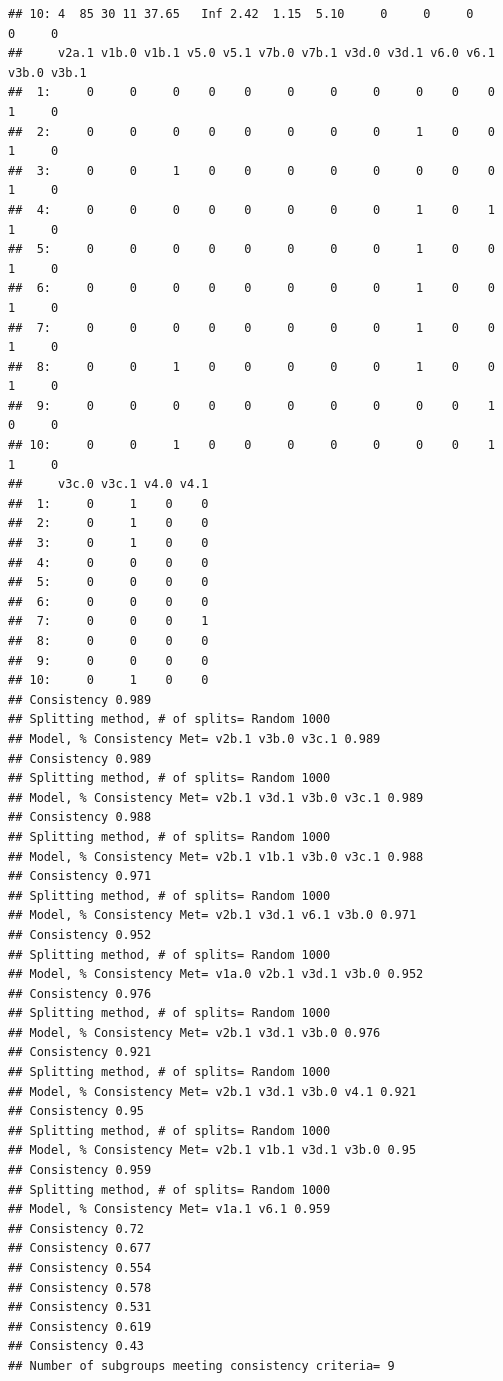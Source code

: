 \documentclass[9pt]{article}\usepackage[]{graphicx}\usepackage[]{xcolor}
\makeatletter
\newenvironment{kframe}{%
 \def\at@end@of@kframe{}%
 \ifinner\ifhmode%
  \def\at@end@of@kframe{\end{minipage}}%
  \begin{minipage}{\columnwidth}%
 \fi\fi%
 \def\FrameCommand##1{\hskip\@totalleftmargin \hskip-\fboxsep
 \colorbox{shadecolor}{##1}\hskip-\fboxsep
     \hskip-\linewidth \hskip-\@totalleftmargin \hskip\columnwidth}%
 \MakeFramed {\advance\hsize-\width
   \@totalleftmargin\z@ \linewidth\hsize
   \@setminipage}}%
 {\par\unskip\endMakeFramed%
 \at@end@of@kframe}
\newenvironment{knitrout}{}{} %
\theoremstyle{definition}
\theoremstyle{remark}
\makeatother
\begin{document}
\begin{knitrout}
\begin{kframe}
\begin{verbatim}
## 10: 4  85 30 11 37.65   Inf 2.42  1.15  5.10     0     0     0     0     0
##     v2a.1 v1b.0 v1b.1 v5.0 v5.1 v7b.0 v7b.1 v3d.0 v3d.1 v6.0 v6.1 v3b.0 v3b.1
##  1:     0     0     0    0    0     0     0     0     0    0    0     1     0
##  2:     0     0     0    0    0     0     0     0     1    0    0     1     0
##  3:     0     0     1    0    0     0     0     0     0    0    0     1     0
##  4:     0     0     0    0    0     0     0     0     1    0    1     1     0
##  5:     0     0     0    0    0     0     0     0     1    0    0     1     0
##  6:     0     0     0    0    0     0     0     0     1    0    0     1     0
##  7:     0     0     0    0    0     0     0     0     1    0    0     1     0
##  8:     0     0     1    0    0     0     0     0     1    0    0     1     0
##  9:     0     0     0    0    0     0     0     0     0    0    1     0     0
## 10:     0     0     1    0    0     0     0     0     0    0    1     1     0
##     v3c.0 v3c.1 v4.0 v4.1
##  1:     0     1    0    0
##  2:     0     1    0    0
##  3:     0     1    0    0
##  4:     0     0    0    0
##  5:     0     0    0    0
##  6:     0     0    0    0
##  7:     0     0    0    1
##  8:     0     0    0    0
##  9:     0     0    0    0
## 10:     0     1    0    0
## Consistency 0.989 
## Splitting method, # of splits= Random 1000 
## Model, % Consistency Met= v2b.1 v3b.0 v3c.1 0.989 
## Consistency 0.989 
## Splitting method, # of splits= Random 1000 
## Model, % Consistency Met= v2b.1 v3d.1 v3b.0 v3c.1 0.989 
## Consistency 0.988 
## Splitting method, # of splits= Random 1000 
## Model, % Consistency Met= v2b.1 v1b.1 v3b.0 v3c.1 0.988 
## Consistency 0.971 
## Splitting method, # of splits= Random 1000 
## Model, % Consistency Met= v2b.1 v3d.1 v6.1 v3b.0 0.971 
## Consistency 0.952 
## Splitting method, # of splits= Random 1000 
## Model, % Consistency Met= v1a.0 v2b.1 v3d.1 v3b.0 0.952 
## Consistency 0.976 
## Splitting method, # of splits= Random 1000 
## Model, % Consistency Met= v2b.1 v3d.1 v3b.0 0.976 
## Consistency 0.921 
## Splitting method, # of splits= Random 1000 
## Model, % Consistency Met= v2b.1 v3d.1 v3b.0 v4.1 0.921 
## Consistency 0.95 
## Splitting method, # of splits= Random 1000 
## Model, % Consistency Met= v2b.1 v1b.1 v3d.1 v3b.0 0.95 
## Consistency 0.959 
## Splitting method, # of splits= Random 1000 
## Model, % Consistency Met= v1a.1 v6.1 0.959 
## Consistency 0.72 
## Consistency 0.677 
## Consistency 0.554 
## Consistency 0.578 
## Consistency 0.531 
## Consistency 0.619 
## Consistency 0.43 
## Number of subgroups meeting consistency criteria= 9 

\end{verbatim}
\end{kframe}
\end{knitrout}
\end{document}
